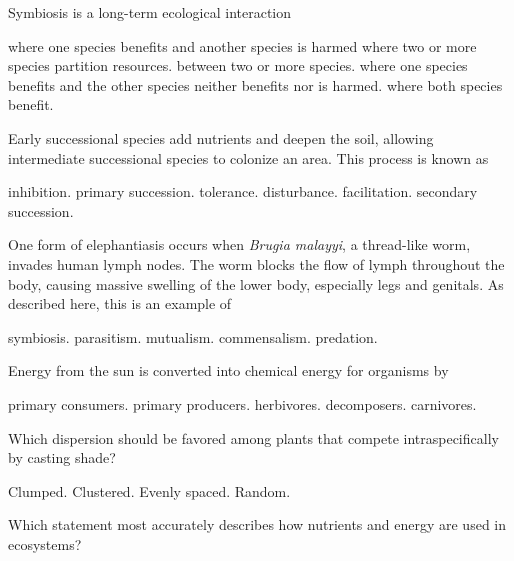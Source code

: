 
\question
Symbiosis is a long-term ecological interaction

\begin{choices}
\choice where one species benefits and another species is harmed 
\choice where two or more species partition resources. 
\correctchoice between two or more species. 
\choice  where one species benefits and the other species neither benefits nor is harmed. 
\choice where both species benefit. 
\end{choices}

\question
Early successional species add nutrients and deepen the soil, allowing intermediate successional species to colonize an area. This process is known as

\begin{choices}
\choice inhibition. 
\choice primary succession. 
\choice tolerance. 
\choice disturbance. 
\correctchoice facilitation. 
\choice secondary succession. 
\end{choices}

\question
One form of elephantiasis occurs when \textit{Brugia malayyi}, a thread-like worm, invades human lymph nodes. The worm blocks the flow of lymph throughout the body, causing massive swelling of the lower body, especially legs and genitals. As described here, this is an example of

\begin{choices}
\choice symbiosis.
\correctchoice parasitism.
\choice mutualism.
\choice commensalism.
\choice predation.
\end{choices}

\question
Energy from the sun is converted into chemical energy for organisms by

\begin{choices}
\choice primary consumers.
\correctchoice primary producers.
\choice herbivores.
\choice decomposers.
\choice carnivores.
\end{choices}

\question
Which dispersion should be favored among plants that compete intraspecifically by casting   shade?

\begin{choices}
\choice Clumped. 
\choice Clustered. 
\correctchoice Evenly spaced. 
\choice Random. 
\end{choices}

\question
Which statement most accurately describes how nutrients and energy are used in ecosystems?

